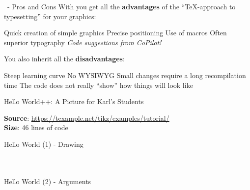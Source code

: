 \begin{frame}{\TikZ\ - Pros and Cons}
    With \TikZ you get all the \textbf{advantages} of the “\TeX-approach to typesetting” for your graphics:
    \begin{itemize}
        \pro Quick creation of simple graphics
        \pro Precise positioning
        \pro Use of macros
        \pro Often superior typography
        \pro \emph{Code suggestions from CoPilot!}
    \end{itemize}
You also inherit all the \textbf{disadvantages}:
    \begin{itemize}
        \con Steep learning curve
        \con No WYSIWYG
        \con Small changes require a long recompilation time
        \con The code does not really “show” how things will look like
    \end{itemize}
\end{frame}

\begin{frame}{Hello World++: A Picture for Karl’s Students}
    \begin{figure}
        \centering
        \begin{adjustbox}{width=0.9\textwidth}
            
        \end{adjustbox}
    \end{figure}
    \textbf{Source}: {\scriptsize\url{https://texample.net/tikz/examples/tutorial/}}
    \\
    \textbf{Size}: 46 lines of code
\end{frame}

\begin{frame}{Hello World (1) - Drawing}
  \begin{columns}
    \begin{column}{0.35\textwidth}
      
    \end{column}
    \begin{column}{0.65\textwidth}
      \inputminted{TeX}{img/tutorial/karl/karl_step_1_standalone.tex}
    \end{column}
  \end{columns}
\end{frame}

\begin{frame}{Hello World (2) - Arguments}
  \begin{columns}
    \begin{column}{0.35\textwidth}
      
    \end{column}
    \begin{column}{0.65\textwidth}
      \inputminted[firstline=6,lastline=10]{TeX}{img/tutorial/karl/karl_step_2_standalone.tex}
    \end{column}
  \end{columns}
\end{frame}

